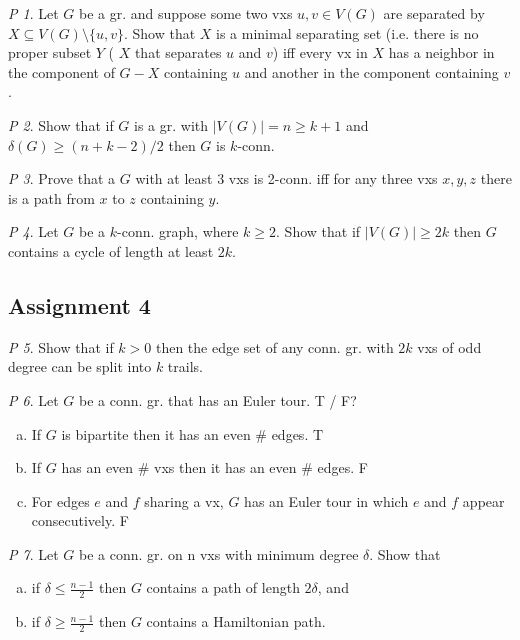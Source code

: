 \documentclass[11pt, fleqn, a4paper, landscape]{article}
\theoremstyle{plain} %
\theoremstyle{remark} %
\newtheorem{problem}{P}
\theoremstyle{definition} %
\begin{document}
\begin{multicols}{5}
\begin{problem}
Let $G$ be a gr. and suppose some two vxs $u, v \in V (G)$ are separated by $X \subseteq V (G)\setminus\{u,v\}$. Show that $X$ is a minimal separating set (i.e. there is no proper subset $Y$ ( $X$ that separates $u$ and $v$) iff every vx in $X$ has a neighbor in the component
of $G-X$ containing $u$ and another in the component containing $v$.
\end{problem}

\begin{problem}
Show that if $G$ is a gr. with $|V (G)| = n \ge k + 1$ and $\delta(G) \ge(n + k-2)/2$ then $G$ is $k$-conn.
\end{problem}

\begin{problem}
Prove that a $G$ with at least 3 vxs is 2-conn. iff for any three vxs $x, y, z$ there is a path from $x$ to $z$ containing $y$.
\end{problem}

\begin{problem}
Let $G$ be a $k$-conn. graph, where $k \ge 2$. Show that if $|V (G)| \ge 2k$ then $G$ contains a cycle of length at least $2k$.
\end{problem}

\subsection{Assignment 4}

\begin{problem}
Show that if $k > 0$ then the edge set of any conn. gr. with $2k$ vxs of odd degree can be split into $k$ trails.
\end{problem}

\begin{problem}
Let $G$ be a conn. gr. that has an Euler tour. T / F?
\begin{enumerate}[(a)]
\item If $G$ is bipartite then it has an even \# edges. T
\item If $G$ has an even \# vxs then it has an even \# edges. F
\item For edges $e$ and $f$ sharing a vx, $G$ has an Euler tour in which $e$ and $f$ appear consecutively. F
\end{enumerate}
\end{problem}

\begin{problem}
Let $G$ be a conn. gr. on n vxs with minimum degree $\delta$. Show that 
\begin{enumerate}[(a)]
\item if $\delta \le \frac{n-1}{2}$ then $G$ contains a path of length $2\delta$, and
\item if $\delta \ge \frac{n-1}{2}$ then $G$ contains a Hamiltonian path.
\end{enumerate}
\end{problem}


\end{multicols}
\end{document}
